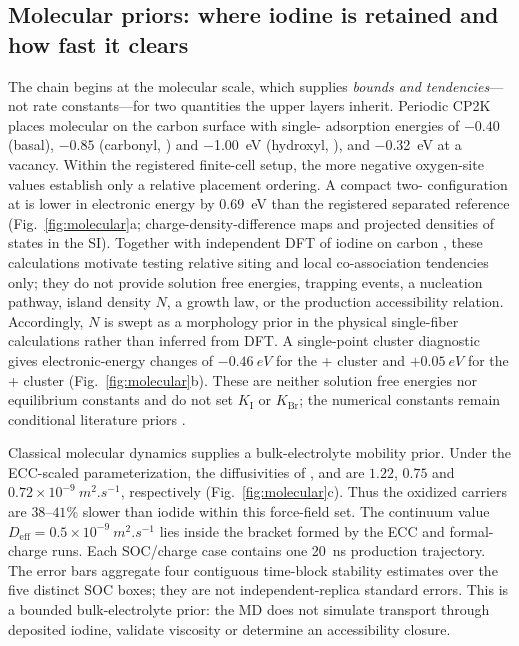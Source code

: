 \documentclass[11pt]{article}
\newcommand{\Deff}{D_{\mathrm{eff}}}
\begin{document}
\subsection{Molecular priors: where iodine is retained and how fast it clears}
\label{sec:res-mol}
The chain begins at the molecular scale, which supplies \emph{bounds and tendencies}---not rate
constants---for two quantities the upper layers inherit. Periodic CP2K places molecular  on the
carbon surface with single- adsorption energies of $-0.40$ (basal), $-0.85$ (carbonyl, )
and \SI{-1.00}{eV} (hydroxyl, ), and \SI{-0.32}{eV} at a vacancy. Within the registered finite-cell
setup, the more negative oxygen-site values establish only a relative placement ordering. A compact
two- configuration at  is lower in electronic energy by \SI{0.69}{eV} than the registered
separated reference (Fig.~\ref{fig:molecular}a; charge-density-difference maps and projected densities of
states in the SI). Together with independent DFT of iodine on carbon
\citep{Iodine_Graphite_DFT2023,Confinement_JACS2022}, these calculations motivate testing relative siting and
local co-association tendencies only; they do not provide solution free energies, trapping events, a
nucleation pathway, island density $N$, a growth law, or the production accessibility relation. Accordingly,
$N$ is swept as a morphology prior in the physical single-fiber calculations rather than inferred from DFT.
A single-point
cluster diagnostic gives electronic-energy changes of $\SI{-0.46}{eV}$ for the
+ cluster and $+\SI{0.05}{eV}$ for the + cluster
(Fig.~\ref{fig:molecular}b). These are neither solution free energies nor equilibrium constants and do not set
$K_{\mathrm I}$ or $K_{\mathrm{Br}}$; the numerical constants remain conditional literature priors
\citep{Palmer1984,Lee2023}.

Classical molecular dynamics supplies a bulk-electrolyte mobility prior. Under the ECC-scaled parameterization,
the diffusivities of ,  and  are $1.22$, $0.75$ and
$0.72\times10^{-9}~\si{m^2.s^{-1}}$, respectively (Fig.~\ref{fig:molecular}c). Thus the oxidized carriers are
$38$--$41\%$ slower than iodide within this force-field set. The continuum value
$\Deff=0.5\times10^{-9}~\si{m^2.s^{-1}}$ lies inside the bracket formed by the ECC and formal-charge runs.
Each SOC/charge case contains one \SI{20}{ns} production trajectory. The error bars aggregate four contiguous
time-block stability estimates over the five distinct SOC boxes; they are not independent-replica standard
errors. This is a bounded bulk-electrolyte prior: the MD does not simulate transport through deposited iodine,
validate viscosity or determine an accessibility closure.
\end{document}
